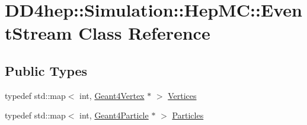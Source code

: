 \hypertarget{class_d_d4hep_1_1_simulation_1_1_hep_m_c_1_1_event_stream}{
\section{DD4hep::Simulation::HepMC::EventStream Class Reference}
\label{class_d_d4hep_1_1_simulation_1_1_hep_m_c_1_1_event_stream}
}
\subsection*{Public Types}
\begin{DoxyCompactItemize}
\item 
typedef std::map$<$ int, \hyperlink{class_d_d4hep_1_1_simulation_1_1_geant4_vertex}{Geant4Vertex} $\ast$ $>$ \hyperlink{class_d_d4hep_1_1_simulation_1_1_hep_m_c_1_1_event_stream_a3e270d38edde8369e52ad396615a2755}{Vertices}
\item 
typedef std::map$<$ int, \hyperlink{class_d_d4hep_1_1_simulation_1_1_geant4_particle}{Geant4Particle} $\ast$ $>$ \hyperlink{class_d_d4hep_1_1_simulation_1_1_hep_m_c_1_1_event_stream_a99e0260f816229d8ab3ebdd5487b3af1}{Particles}
\end{DoxyCompactItemize}
